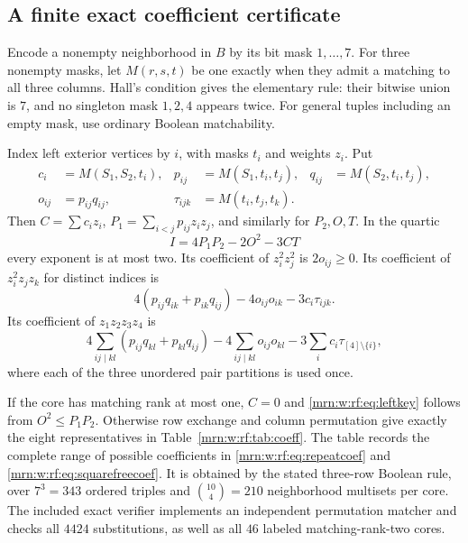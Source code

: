 \documentclass[11pt,a4paper]{article}
\theoremstyle{remark}\newtheorem{remark}[theorem]{Remark}
\begin{document}
\subsection{A finite exact coefficient certificate}
Encode a nonempty neighborhood in $B$ by its bit mask $1,\ldots,7$. For three nonempty masks, let $M(r,s,t)$ be one exactly when they admit a matching to all three columns. Hall's condition gives the elementary rule: their bitwise union is $7$, and no singleton mask $1,2,4$ appears twice. For general tuples including an empty mask, use ordinary Boolean matchability.

Index left exterior vertices by $i$, with masks $t_i$ and weights $z_i$. Put
\begin{align*}
 c_i&=M(S_1,S_2,t_i),&p_{ij}&=M(S_1,t_i,t_j),&q_{ij}&=M(S_2,t_i,t_j),\\
 o_{ij}&=p_{ij}q_{ij},&\tau_{ijk}&=M(t_i,t_j,t_k).
\end{align*}
Then $C=\sum c_iz_i$, $P_1=\sum_{i<j}p_{ij}z_iz_j$, and similarly for $P_2,O,T$. In the quartic
\[
 I=4P_1P_2-2O^2-3CT
\]
every exponent is at most two. Its coefficient of $z_i^2z_j^2$ is $2o_{ij}\ge0$. Its coefficient of $z_i^2z_jz_k$ for distinct indices is
\begin{equation}\label{mrn:w:rf:eq:repeatcoef}
 4(p_{ij}q_{ik}+p_{ik}q_{ij})-4o_{ij}o_{ik}-3c_i\tau_{ijk}.
\end{equation}
Its coefficient of $z_1z_2z_3z_4$ is
\begin{equation}\label{mrn:w:rf:eq:squarefreecoef}
 4\sum_{ij\mid kl}(p_{ij}q_{kl}+p_{kl}q_{ij})
 -4\sum_{ij\mid kl}o_{ij}o_{kl}
 -3\sum_i c_i\tau_{[4]\setminus\{i\}},
\end{equation}
where each of the three unordered pair partitions is used once.

If the core has matching rank at most one, $C=0$ and \eqref{mrn:w:rf:eq:leftkey} follows from $O^2\le P_1P_2$. Otherwise row exchange and column permutation give exactly the eight representatives in Table~\ref{mrn:w:rf:tab:coeff}. The table records the complete range of possible coefficients in \eqref{mrn:w:rf:eq:repeatcoef} and \eqref{mrn:w:rf:eq:squarefreecoef}. It is obtained by the stated three-row Boolean rule, over $7^3=343$ ordered triples and $\binom{10}{4}=210$ neighborhood multisets per core. The included exact verifier implements an independent permutation matcher and checks all $4424$ substitutions, as well as all $46$ labeled matching-rank-two cores.
\end{document}
